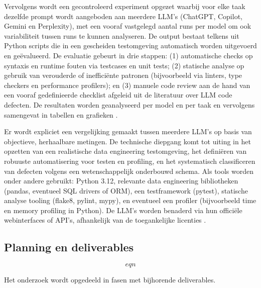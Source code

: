 \documentclass{hogent-article}
\begin{document}
Vervolgens wordt een gecontroleerd experiment opgezet waarbij voor elke taak dezelfde prompt wordt aangeboden aan meerdere LLM’s (ChatGPT, Copilot, Gemini en Perplexity), met een vooraf vastgelegd aantal runs per model om ook variabiliteit tussen runs te kunnen analyseren. De output bestaat telkens uit Python scripts die in een gescheiden testomgeving automatisch worden uitgevoerd en geëvalueerd. De evaluatie gebeurt in drie stappen: (1) automatische checks op syntaxis en runtime fouten via testcases en unit tests; (2) statische analyse op gebruik van verouderde of inefficiënte patronen (bijvoorbeeld via linters, type checkers en performance profilers); en (3) manuele code review aan de hand van een vooraf gedefinieerde checklist afgeleid uit de literatuur over LLM code defecten. De resultaten worden geanalyseerd per model en per taak en vervolgens samengevat in tabellen en grafieken \autocite{Esfahani2024}.​

Er wordt expliciet een vergelijking gemaakt tussen meerdere LLM’s op basis van objectieve, herhaalbare metingen. De technische diepgang komt tot uiting in het opzetten van een realistische data engineering testomgeving, het definiëren van robuuste automatisering voor testen en profiling, en het systematisch classificeren van defecten volgens een wetenschappelijk onderbouwd schema. Als tools worden onder andere gebruikt: Python 3.12, relevante data engineering bibliotheken (pandas, eventueel SQL drivers of ORM), een testframework (pytest), statische analyse tooling (flake8, pylint, mypy), en eventueel een profiler (bijvoorbeeld time en memory profiling in Python). De LLM’s worden benaderd via hun officiële webinterfaces of API’s, afhankelijk van de toegankelijke licenties \autocite{Nascimento2024}.​


\subsection{Planning en deliverables} \begin{equation}
    eqn
\end{equation}

Het onderzoek wordt opgedeeld in fasen met bijhorende deliverables.
\end{document}
